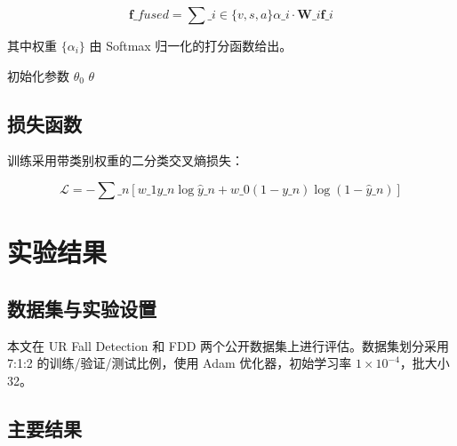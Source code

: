 \begin{equation}
\mathbf{f}\_{fused} = \sum\_{i \in \{v,s,a\}} \alpha\_i \cdot \mathbf{W}\_i \mathbf{f}\_i
\end{equation}


其中权重 $\{\alpha_i\}$ 由 Softmax 归一化的打分函数给出。


\begin{algorithm}[H]
  \caption{示例算法（实际使用时替换为论文中的算法）}
  \label{alg:demo}
  初始化参数 $\theta_0$\;
  \Return $\theta$\;
\end{algorithm}

\subsection{损失函数}\label{3-3-损失函数}

训练采用带类别权重的二分类交叉熵损失：


\begin{equation}
\mathcal{L} = -\sum\_{n} \left[ w\_1 y\_n \log \hat{y}\_n + w\_0 (1-y\_n) \log(1-\hat{y}\_n) \right]
\end{equation}


\section{实验结果}\label{第4章-实验结果}

\subsection{数据集与实验设置}\label{4-1-数据集与实验设置}

本文在 UR Fall Detection\cite{ref7} 和 FDD\cite{ref8} 两个公开数据集上进行评估。数据集划分采用 7:1:2 的训练/验证/测试比例，使用 Adam 优化器，初始学习率 $1 \times 10^{-4}$，批大小 32。


\subsection{主要结果}\label{4-2-主要结果}

